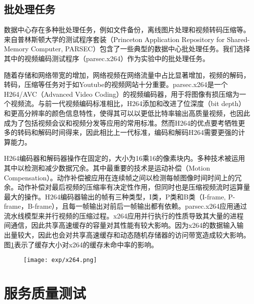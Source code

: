 \subsection{批处理任务}
数据中心存在多种批处理任务，例如文件备份，离线图片处理和视频转码压缩等。来自普林斯顿大学的测试程序套装（Princeton Application Repository for Shared-Memory Computer, PARSEC）\cite{bienia11benchmarking}包含了一些典型的数据中心批处理任务。我们选择其中的视频编码测试程序（parsec.x264）作为实验中的批处理任务。

随着存储和网络带宽的增加，网络视频在网络流量中占比显著增加，视频的解码，转码，压缩等任务对于如Youtube的视频网站十分重要。parsec.x264是一个H264/AVC（Advanced Video Coding）的视频编码器，用于将图像有损压缩为一个视频流。与前一代视频编码标准相比，H264添加和改进了位深度（bit depth）和更高分辨率的颜色信息特性，使得其可以以更低比特率输出高质量视频，也因此成为了包括视频会议和视频分发等应用的常用标准。然而H264的优点要考牺牲更多的转码和解码时间得来，因此相比上一代标准，编码和解码H264需要更强的计算能力。

H264编码器和解码器操作在固定的，大小为16乘16的像素块内。多种技术被运用其中以检测和减少数据冗余。其中最重要的技术是运动补偿（Motion Compensation）。动作补偿被应用在连续帧之间以检测每帧图像时间时间上的冗余。动作补偿对最后视频的压缩率有决定性作用，但同时也是压缩视频流时运算量最大的操作。H264编码器输出的帧有三种类型，I类，P类和B类（I-frame, P-frame，B-frame），且每一帧输出对前后一帧输出都有依赖。parsec.x264应用通过流水线模型来并行视频的压缩过程。x264应用并行执行的性质导致其大量的进程间通信，因此共享高速缓存的容量对其性能有较大影响。因为x264的数据输入输出量较大，因此也会对共享高速缓存和动态随机存储器的访问带宽造成较大影响。图\ref{fig:x264}表示了缓存大小对x264的缓存未命中率的影响\cite{bienia2008parsec}。

\begin{figure}
  \centering
    \centering
    \texttt{[image: exp/x264.png]}
    \label{fig:x264}    
\end{figure}



\section{服务质量测试}

